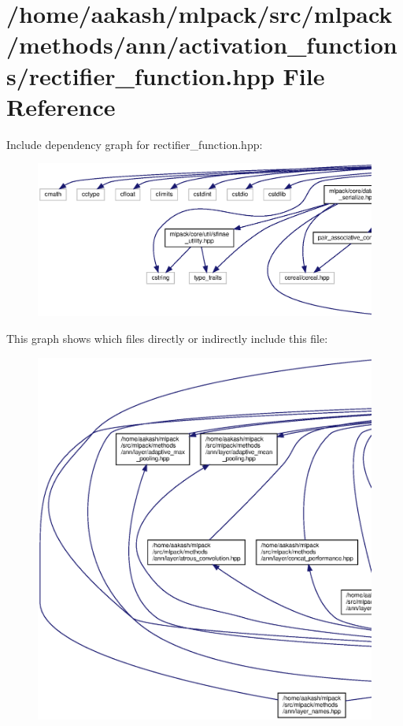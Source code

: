\section{/home/aakash/mlpack/src/mlpack/methods/ann/activation\+\_\+functions/rectifier\+\_\+function.hpp File Reference}
\label{rectifier__function_8hpp}
Include dependency graph for rectifier\+\_\+function.\+hpp\+:
\nopagebreak
\begin{figure}[H]
\begin{center}
\leavevmode
\includegraphics[width=350pt]{rectifier__function_8hpp__incl}
\end{center}
\end{figure}
This graph shows which files directly or indirectly include this file\+:
\nopagebreak
\begin{figure}[H]
\begin{center}
\leavevmode
\includegraphics[width=350pt]{rectifier__function_8hpp__dep__incl}
\end{center}
\end{figure}
